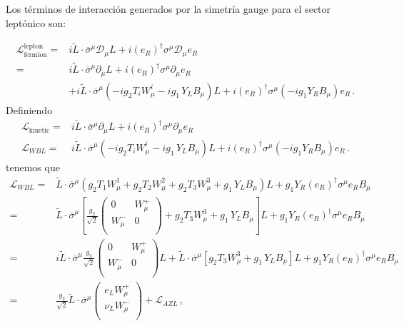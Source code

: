 Los términos de interacción generados por la simetría gauge para el sector leptónico son:
\begin{frame}
\begin{align}
\label{eq:devLW}
 \mathcal{L}_{\text{fermion}}^{\text{lepton}}=& i \widetilde{L}\cdot\overline{\sigma}^\mu\mathcal{D}_\mu L+  i \left( e_R \right)^{\dagger}{\sigma}^\mu\mathcal{D}_\mu e_R \nonumber\\
=&i \widetilde{L}\cdot\overline{\sigma}^\mu\partial_\mu L+i \left(e_R  \right)^{\dagger}\sigma^\mu\partial_\mu {e_R} \nonumber\\
&+ i \widetilde{L}\cdot\overline{\sigma}^\mu(-i g_2 T_iW_\mu^i-i {g_1}\,Y_LB_\mu) L + i \left( e_R \right)^{\dagger}\sigma^\mu \left( -i{g_1} Y_R B_{\mu} \right) {e_R}\,.
\end{align}
Definiendo
\begin{align}
\label{eq:knt}
  \mathcal{L}_{\text{kinetic}}=&i \widetilde{L}\cdot\overline{\sigma}^\mu\partial_\mu L+i \left(e_R  \right)^{\dagger}\sigma^\mu\partial_\mu {e_R} \\
  \mathcal{L}_{WBL}=&i \widetilde{L}\cdot\overline{\sigma}^\mu(-i g_2 T_iW_\mu^i-i {g_1}\,Y_LB_\mu) L + i \left( e_R \right)^{\dagger}\sigma^\mu \left( -i{g_1} Y_R B_{\mu} \right) {e_R}\nonumber\,.
\end{align}
tenemos que
\begin{align}
\mathcal{L}_{WBL}=& \widetilde{L}\cdot\overline{\sigma}^\mu(g_2 T_1W_\mu^1+ g_2 T_2W_\mu^2+g_2 T_3W_\mu^3+{g_1}\,Y_LB_\mu) L+ g_1 Y_R\left(e_R \right)^{\dagger}\sigma^\mu  {e_R} B_\mu\nonumber\\
=& \widetilde{L}\cdot\overline{\sigma}^\mu\left[\frac{g_2}{\sqrt{2}}
  \begin{pmatrix}
0 & W_\mu^+\\
W_\mu^- & 0\\    
  \end{pmatrix}
+g_2 T_3W_\mu^3+{g_1}\,Y_LB_\mu
\right]L+ {g_1} Y_R\left(e_R \right)^{\dagger}\sigma^\mu  {e_R} B_\mu\nonumber\\
=&i \widetilde{L}\cdot\overline{\sigma}^\mu\frac{g_2}{\sqrt{2}}
  \begin{pmatrix}
0 & W_\mu^+\\
W_\mu^- & 0\\    
  \end{pmatrix}L+
 \widetilde{L}\cdot\overline{\sigma}^\mu\left[g_2 T_3W_\mu^3+{g_1}\,Y_LB_\mu
\right]L+ {g_1} Y_R\left(e_R \right)^{\dagger}\sigma^\mu  {e_R} B_\mu\nonumber\\
  =& \frac{g_2}{\sqrt{2}}\widetilde{L}\cdot\overline{\sigma}^\mu
  \begin{pmatrix}
e_LW_\mu^+\\
\nu_L W_\mu^-\\    
  \end{pmatrix}+\mathcal{L}_{A Z L}\,,
\end{align}


\end{frame}
